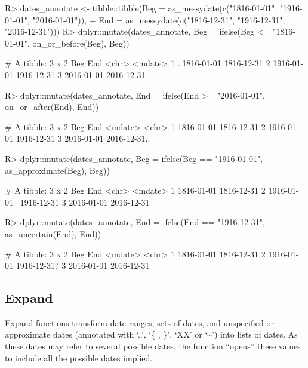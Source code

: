 \documentclass[
]{jss}
\begin{document}
\begin{CodeChunk}
\begin{CodeInput}
R> dates_annotate <- tibble::tibble(Beg = as_messydate(c("1816-01-01", "1916-01-01", "2016-01-01")),
+                                  End = as_messydate(c("1816-12-31", "1916-12-31", "2016-12-31")))
R> dplyr::mutate(dates_annotate, Beg = ifelse(Beg <= "1816-01-01", on_or_before(Beg), Beg))
\end{CodeInput}
\begin{CodeOutput}
# A tibble: 3 x 2
  Beg          End       
  <chr>        <mdate>   
1 ..1816-01-01 1816-12-31
2 1916-01-01   1916-12-31
3 2016-01-01   2016-12-31
\end{CodeOutput}
\begin{CodeInput}
R> dplyr::mutate(dates_annotate, End = ifelse(End >= "2016-01-01", on_or_after(End), End))
\end{CodeInput}
\begin{CodeOutput}
# A tibble: 3 x 2
  Beg        End         
  <mdate>    <chr>       
1 1816-01-01 1816-12-31  
2 1916-01-01 1916-12-31  
3 2016-01-01 2016-12-31..
\end{CodeOutput}
\begin{CodeInput}
R> dplyr::mutate(dates_annotate, Beg = ifelse(Beg == "1916-01-01", as_approximate(Beg), Beg))
\end{CodeInput}
\begin{CodeOutput}
# A tibble: 3 x 2
  Beg         End       
  <chr>       <mdate>   
1 1816-01-01  1816-12-31
2 1916-01-01~ 1916-12-31
3 2016-01-01  2016-12-31
\end{CodeOutput}
\begin{CodeInput}
R> dplyr::mutate(dates_annotate, End = ifelse(End == "1916-12-31", as_uncertain(End), End))
\end{CodeInput}
\begin{CodeOutput}
# A tibble: 3 x 2
  Beg        End        
  <mdate>    <chr>      
1 1816-01-01 1816-12-31 
2 1916-01-01 1916-12-31?
3 2016-01-01 2016-12-31 
\end{CodeOutput}
\end{CodeChunk}

\hypertarget{expand}{%
\subsection{Expand}\label{expand}}

Expand functions transform date ranges, sets of dates, and unspecified
or approximate dates (annotated with `..', `\{ , \}', `XX' or
`\textasciitilde{}') into lists of dates. As these dates may refer to
several possible dates, the function ``opens'' these values to include
all the possible dates implied.
\end{document}
